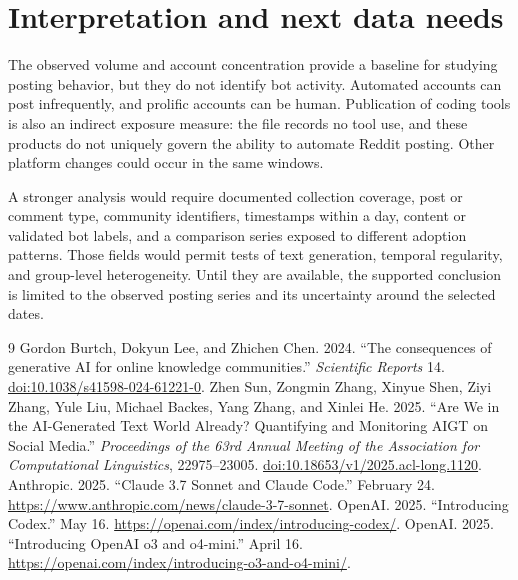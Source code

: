 \documentclass[11pt]{article}
\begin{document}
\section{Interpretation and next data needs}
The observed volume and account concentration provide a baseline for studying posting behavior, but they do not identify bot activity. Automated accounts can post infrequently, and prolific accounts can be human. Publication of coding tools is also an indirect exposure measure: the file records no tool use, and these products do not uniquely govern the ability to automate Reddit posting. Other platform changes could occur in the same windows.

A stronger analysis would require documented collection coverage, post or comment type, community identifiers, timestamps within a day, content or validated bot labels, and a comparison series exposed to different adoption patterns. Those fields would permit tests of text generation, temporal regularity, and group-level heterogeneity. Until they are available, the supported conclusion is limited to the observed posting series and its uncertainty around the selected dates.

\begin{thebibliography}{9}
 Gordon Burtch, Dokyun Lee, and Zhichen Chen. 2024. ``The consequences of generative AI for online knowledge communities.'' \emph{Scientific Reports} 14. \href{https://doi.org/10.1038/s41598-024-61221-0}{doi:10.1038/s41598-024-61221-0}.
 Zhen Sun, Zongmin Zhang, Xinyue Shen, Ziyi Zhang, Yule Liu, Michael Backes, Yang Zhang, and Xinlei He. 2025. ``Are We in the AI-Generated Text World Already? Quantifying and Monitoring AIGT on Social Media.'' \emph{Proceedings of the 63rd Annual Meeting of the Association for Computational Linguistics}, 22975--23005. \href{https://doi.org/10.18653/v1/2025.acl-long.1120}{doi:10.18653/v1/2025.acl-long.1120}.
 Anthropic. 2025. ``Claude 3.7 Sonnet and Claude Code.'' February 24. \url{https://www.anthropic.com/news/claude-3-7-sonnet}.
 OpenAI. 2025. ``Introducing Codex.'' May 16. \url{https://openai.com/index/introducing-codex/}.
 OpenAI. 2025. ``Introducing OpenAI o3 and o4-mini.'' April 16. \url{https://openai.com/index/introducing-o3-and-o4-mini/}.
\end{thebibliography}
\end{document}
